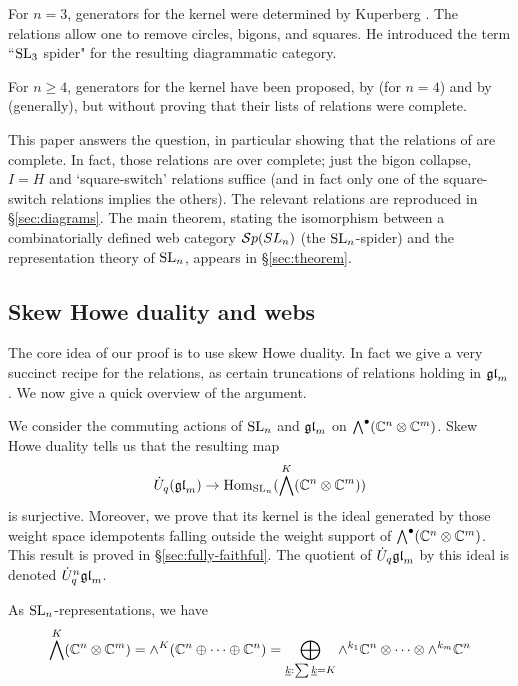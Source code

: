 \documentclass[10pt,leqno]{article}
\begin{document}
For $n=3$, generators for the kernel were determined by Kuperberg \cite{MR1403861}.  The relations allow one to remove circles, bigons, and squares.  He introduced the term ``${\rm{SL}}_3$ spider" for the resulting diagrammatic category.

For $n \geq 4$, generators for the kernel have been proposed, by \cite{math.QA/0310143} (for $n=4$) and by \cite{0704.1503} (generally), but without proving that their lists of relations were complete.

This paper answers the question, in particular showing that the relations of \cite{0704.1503} are complete. In fact, those relations are over complete; just the bigon collapse, $I=H$ and `square-switch' relations suffice (and in fact only one of the square-switch relations implies the others). The relevant relations are reproduced in \S\ref{sec:diagrams}.
The main theorem, stating the isomorphism between a combinatorially defined web category ${\mathcal{S}p}(SL_n)$ (the ${\rm{SL}}_n $-spider) and the representation theory of ${\rm{SL}}_n$, appears in \S \ref{sec:theorem}.


\subsection{Skew Howe duality and webs}
The core idea of our proof is to use skew Howe duality.  In fact we give a very succinct recipe for the relations, as certain truncations of relations holding in ${\mathfrak{gl}}_m$.  We now give a quick overview of the argument.

We consider the commuting actions of $ {\rm{SL}}_n $ and $ {\mathfrak{gl}}_m $ on $\bigwedge^\bullet(\mathbb{C}^n \otimes \mathbb{C}^m)$.  Skew Howe duality tells us that the resulting map
\begin{equation}
\dot{{{U}}}_q({\mathfrak{gl}}_m) \rightarrow \operatorname{Hom}_{{\rm{SL}}_n}(\bigwedge^K(\mathbb{C}^n \otimes \mathbb{C}^m))
\end{equation}
is surjective.  Moreover, we prove that its kernel is the ideal generated by those weight space idempotents falling outside the weight support of $\bigwedge^\bullet(\mathbb C^n \otimes \mathbb C^m)$.  This result is proved in \S \ref{sec:fully-faithful}.  The quotient of $ \dot{{{U}}}_q{\mathfrak{gl}}_m $ by this ideal is denoted $\dot{{{U}}}_q^n{\mathfrak{gl}}_m$.

As ${\rm{SL}}_n$-representations, we have
\begin{equation*}
\bigwedge^K(\mathbb C^n \otimes \mathbb C^m)  = \wedge^K(\mathbb C^n \oplus \cdots \oplus \mathbb C^n)
         = \bigoplus_{\underline{k}: \sum \underline{k} = K} \wedge^{k_1} \mathbb C^n \otimes \cdots \otimes \wedge^{k_m} {\mathbb{C}}^n
\end{equation*}
\end{document}
